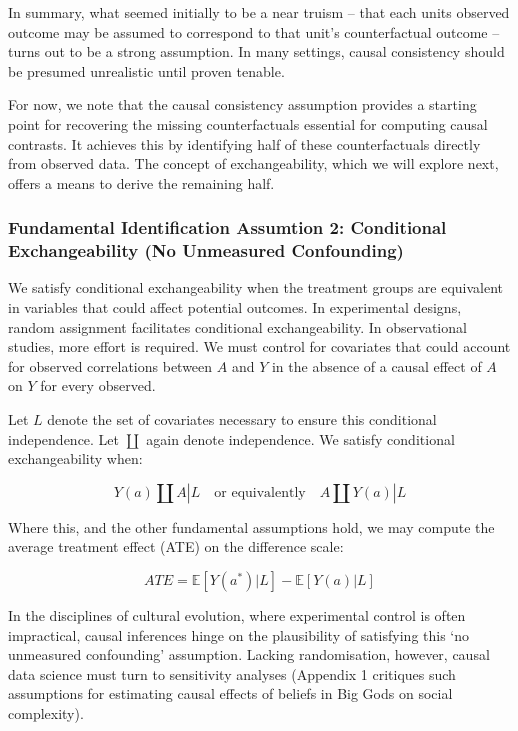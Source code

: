 \documentclass[
  singlecolumn,
  9pt]{article}
\begin{document}
In summary, what seemed initially to be a near truism -- that each units
observed outcome may be assumed to correspond to that unit's
counterfactual outcome -- turns out to be a strong assumption. In many
settings, causal consistency should be presumed unrealistic until proven
tenable.

For now, we note that the causal consistency assumption provides a
starting point for recovering the missing counterfactuals essential for
computing causal contrasts. It achieves this by identifying half of
these counterfactuals directly from observed data. The concept of
exchangeability, which we will explore next, offers a means to derive
the remaining half.

\subsubsection{Fundamental Identification Assumtion 2: Conditional
Exchangeability (No Unmeasured
Confounding)}\label{fundamental-identification-assumtion-2-conditional-exchangeability-no-unmeasured-confounding}

We satisfy conditional exchangeability when the treatment groups are
equivalent in variables that could affect potential outcomes. In
experimental designs, random assignment facilitates conditional
exchangeability. In observational studies, more effort is required. We
must control for covariates that could account for observed correlations
between \(A\) and \(Y\) in the absence of a causal effect of \(A\) on
\(Y\) for every observed.

Let \(L\) denote the set of covariates necessary to ensure this
conditional independence. Let \(\coprod\) again denote independence. We
satisfy conditional exchangeability when:

\[
Y(a) \coprod A | L \quad \text{or equivalently} \quad A \coprod Y(a) | L
\]

Where this, and the other fundamental assumptions hold, we may compute
the average treatment effect (ATE) on the difference scale:

\[
ATE = \mathbb{E}[Y(a^*) | L] - \mathbb{E}[Y(a) | L]
\]

In the disciplines of cultural evolution, where experimental control is
often impractical, causal inferences hinge on the plausibility of
satisfying this `no unmeasured confounding' assumption. Lacking
randomisation, however, causal data science must turn to sensitivity
analyses (Appendix 1 critiques such assumptions for estimating causal
effects of beliefs in Big Gods on social complexity).
\end{document}
